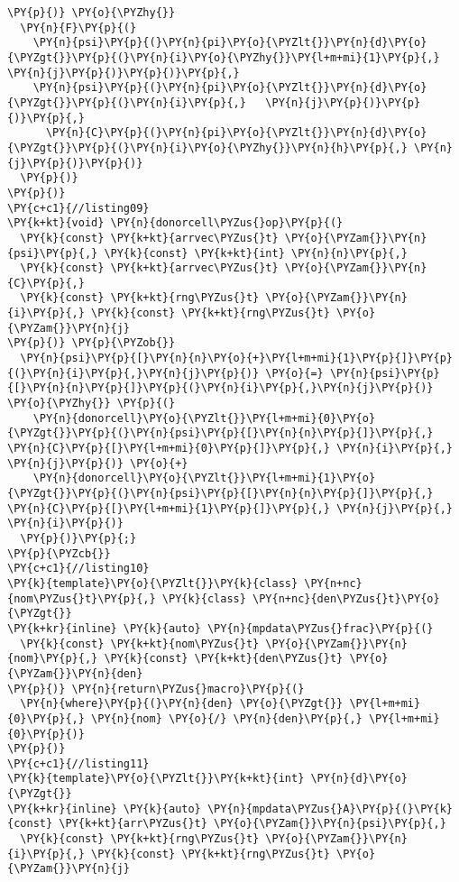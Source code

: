 \begin{Verbatim}[commandchars=\\\{\}]
  \PY{p}{)} \PY{o}{\PYZhy{}}
  \PY{n}{F}\PY{p}{(}
    \PY{n}{psi}\PY{p}{(}\PY{n}{pi}\PY{o}{\PYZlt{}}\PY{n}{d}\PY{o}{\PYZgt{}}\PY{p}{(}\PY{n}{i}\PY{o}{\PYZhy{}}\PY{l+m+mi}{1}\PY{p}{,} \PY{n}{j}\PY{p}{)}\PY{p}{)}\PY{p}{,} 
    \PY{n}{psi}\PY{p}{(}\PY{n}{pi}\PY{o}{\PYZlt{}}\PY{n}{d}\PY{o}{\PYZgt{}}\PY{p}{(}\PY{n}{i}\PY{p}{,}   \PY{n}{j}\PY{p}{)}\PY{p}{)}\PY{p}{,} 
      \PY{n}{C}\PY{p}{(}\PY{n}{pi}\PY{o}{\PYZlt{}}\PY{n}{d}\PY{o}{\PYZgt{}}\PY{p}{(}\PY{n}{i}\PY{o}{\PYZhy{}}\PY{n}{h}\PY{p}{,} \PY{n}{j}\PY{p}{)}\PY{p}{)}
  \PY{p}{)}
\PY{p}{)}
\PY{c+c1}{//listing09}
\PY{k+kt}{void} \PY{n}{donorcell\PYZus{}op}\PY{p}{(}
  \PY{k}{const} \PY{k+kt}{arrvec\PYZus{}t} \PY{o}{\PYZam{}}\PY{n}{psi}\PY{p}{,} \PY{k}{const} \PY{k+kt}{int} \PY{n}{n}\PY{p}{,}
  \PY{k}{const} \PY{k+kt}{arrvec\PYZus{}t} \PY{o}{\PYZam{}}\PY{n}{C}\PY{p}{,} 
  \PY{k}{const} \PY{k+kt}{rng\PYZus{}t} \PY{o}{\PYZam{}}\PY{n}{i}\PY{p}{,} \PY{k}{const} \PY{k+kt}{rng\PYZus{}t} \PY{o}{\PYZam{}}\PY{n}{j}
\PY{p}{)} \PY{p}{\PYZob{}} 
  \PY{n}{psi}\PY{p}{[}\PY{n}{n}\PY{o}{+}\PY{l+m+mi}{1}\PY{p}{]}\PY{p}{(}\PY{n}{i}\PY{p}{,}\PY{n}{j}\PY{p}{)} \PY{o}{=} \PY{n}{psi}\PY{p}{[}\PY{n}{n}\PY{p}{]}\PY{p}{(}\PY{n}{i}\PY{p}{,}\PY{n}{j}\PY{p}{)} \PY{o}{\PYZhy{}} \PY{p}{(}
    \PY{n}{donorcell}\PY{o}{\PYZlt{}}\PY{l+m+mi}{0}\PY{o}{\PYZgt{}}\PY{p}{(}\PY{n}{psi}\PY{p}{[}\PY{n}{n}\PY{p}{]}\PY{p}{,} \PY{n}{C}\PY{p}{[}\PY{l+m+mi}{0}\PY{p}{]}\PY{p}{,} \PY{n}{i}\PY{p}{,} \PY{n}{j}\PY{p}{)} \PY{o}{+}
    \PY{n}{donorcell}\PY{o}{\PYZlt{}}\PY{l+m+mi}{1}\PY{o}{\PYZgt{}}\PY{p}{(}\PY{n}{psi}\PY{p}{[}\PY{n}{n}\PY{p}{]}\PY{p}{,} \PY{n}{C}\PY{p}{[}\PY{l+m+mi}{1}\PY{p}{]}\PY{p}{,} \PY{n}{j}\PY{p}{,} \PY{n}{i}\PY{p}{)}
  \PY{p}{)}\PY{p}{;} 
\PY{p}{\PYZcb{}}
\PY{c+c1}{//listing10}
\PY{k}{template}\PY{o}{\PYZlt{}}\PY{k}{class} \PY{n+nc}{nom\PYZus{}t}\PY{p}{,} \PY{k}{class} \PY{n+nc}{den\PYZus{}t}\PY{o}{\PYZgt{}}
\PY{k+kr}{inline} \PY{k}{auto} \PY{n}{mpdata\PYZus{}frac}\PY{p}{(}
  \PY{k}{const} \PY{k+kt}{nom\PYZus{}t} \PY{o}{\PYZam{}}\PY{n}{nom}\PY{p}{,} \PY{k}{const} \PY{k+kt}{den\PYZus{}t} \PY{o}{\PYZam{}}\PY{n}{den}
\PY{p}{)} \PY{n}{return\PYZus{}macro}\PY{p}{(}
  \PY{n}{where}\PY{p}{(}\PY{n}{den} \PY{o}{\PYZgt{}} \PY{l+m+mi}{0}\PY{p}{,} \PY{n}{nom} \PY{o}{/} \PY{n}{den}\PY{p}{,} \PY{l+m+mi}{0}\PY{p}{)}
\PY{p}{)} 
\PY{c+c1}{//listing11}
\PY{k}{template}\PY{o}{\PYZlt{}}\PY{k+kt}{int} \PY{n}{d}\PY{o}{\PYZgt{}}
\PY{k+kr}{inline} \PY{k}{auto} \PY{n}{mpdata\PYZus{}A}\PY{p}{(}\PY{k}{const} \PY{k+kt}{arr\PYZus{}t} \PY{o}{\PYZam{}}\PY{n}{psi}\PY{p}{,} 
  \PY{k}{const} \PY{k+kt}{rng\PYZus{}t} \PY{o}{\PYZam{}}\PY{n}{i}\PY{p}{,} \PY{k}{const} \PY{k+kt}{rng\PYZus{}t} \PY{o}{\PYZam{}}\PY{n}{j}

\end{Verbatim}
